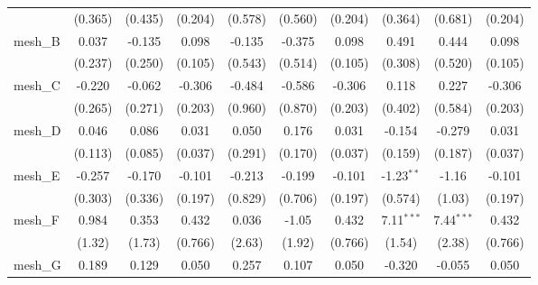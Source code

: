 \begin{tabular}{lccccccccc}
                                                               & (0.365)     & (0.435)       & (0.204)       & (0.578)  & (0.560)    & (0.204)       & (0.364)       & (0.681)       & (0.204)\\   
   mesh\_B                                                     & 0.037       & -0.135        & 0.098         & -0.135   & -0.375     & 0.098         & 0.491         & 0.444         & 0.098\\   
                                                               & (0.237)     & (0.250)       & (0.105)       & (0.543)  & (0.514)    & (0.105)       & (0.308)       & (0.520)       & (0.105)\\   
   mesh\_C                                                     & -0.220      & -0.062        & -0.306        & -0.484   & -0.586     & -0.306        & 0.118         & 0.227         & -0.306\\   
                                                               & (0.265)     & (0.271)       & (0.203)       & (0.960)  & (0.870)    & (0.203)       & (0.402)       & (0.584)       & (0.203)\\   
   mesh\_D                                                     & 0.046       & 0.086         & 0.031         & 0.050    & 0.176      & 0.031         & -0.154        & -0.279        & 0.031\\   
                                                               & (0.113)     & (0.085)       & (0.037)       & (0.291)  & (0.170)    & (0.037)       & (0.159)       & (0.187)       & (0.037)\\   
   mesh\_E                                                     & -0.257      & -0.170        & -0.101        & -0.213   & -0.199     & -0.101        & -1.23$^{**}$  & -1.16         & -0.101\\   
                                                               & (0.303)     & (0.336)       & (0.197)       & (0.829)  & (0.706)    & (0.197)       & (0.574)       & (1.03)        & (0.197)\\   
   mesh\_F                                                     & 0.984       & 0.353         & 0.432         & 0.036    & -1.05      & 0.432         & 7.11$^{***}$  & 7.44$^{***}$  & 0.432\\   
                                                               & (1.32)      & (1.73)        & (0.766)       & (2.63)   & (1.92)     & (0.766)       & (1.54)        & (2.38)        & (0.766)\\   
   mesh\_G                                                     & 0.189       & 0.129         & 0.050         & 0.257    & 0.107      & 0.050         & -0.320        & -0.055        & 0.050\\   

\end{tabular}
